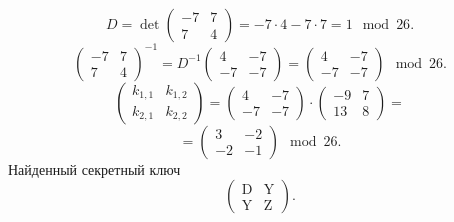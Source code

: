 \[
    D = \det \left( \begin{array}{cc} -7 & 7 \\ 7 & 4 \end{array} \right) = -7 \cdot 4 - 7 \cdot 7 = 1 \mod 26.
\] \[
    \left( \begin{array}{cc} -7 & 7 \\ 7 & 4 \end{array} \right)^{-1} =
    D^{-1} \left( \begin{array}{cc} 4 & -7 \\ -7 & -7 \end{array} \right) =
    \left( \begin{array}{cc} 4 & -7 \\ -7 & -7 \end{array} \right) \mod 26.
\] \[
    \left( \begin{array}{cc} k_{1,1} & k_{1,2} \\ k_{2,1} & k_{2,2} \end{array} \right) =
    \left( \begin{array}{cc} 4 & -7 \\ -7 & -7 \end{array} \right) \cdot
    \left( \begin{array}{cc} -9 & 7 \\ 13 & 8 \end{array} \right) =
\] \[
    = \left( \begin{array}{cc} 3 & -2 \\ -2 & -1 \end{array} \right) \mod 26.
\]
Найденный секретный ключ
\[
    \left( \begin{array}{cc} \text{D} & \text{Y} \\ \text{Y} & \text{Z} \end{array} \right).
\]
\exampleend

